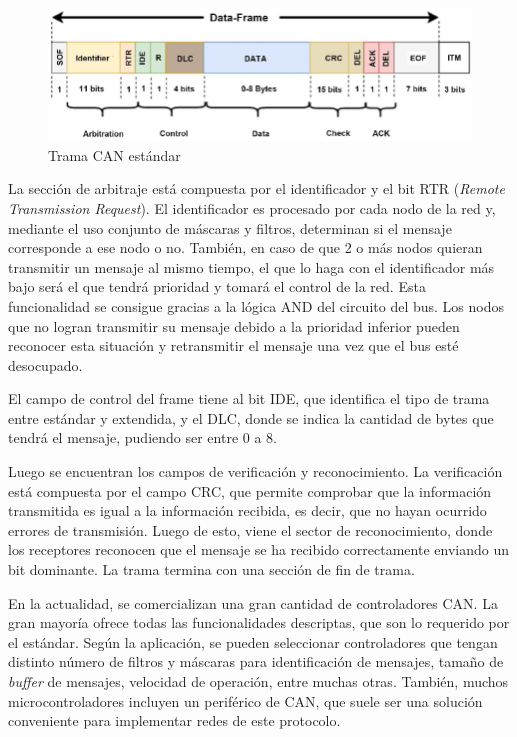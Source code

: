\begin{figure}[htbp]
	\centering
	\includegraphics[scale=.4]{./Figures/CANBUS-frame.png}
	\caption{Trama CAN estándar\protect\footnotemark}
	\label{fig:trama_can}
\end{figure}


La sección de arbitraje está compuesta por el identificador y el bit RTR (\textit{Remote Transmission Request}). El identificador es procesado por cada nodo de la red y, mediante el uso conjunto de máscaras y filtros, determinan si el mensaje corresponde a ese nodo o no. También, en caso de que 2 o más nodos quieran transmitir un mensaje al mismo tiempo, el que lo haga con el identificador más bajo será el que tendrá prioridad y tomará el control de la red. Esta funcionalidad se consigue gracias a la lógica AND del circuito del bus. Los nodos que no logran transmitir su mensaje debido a la prioridad inferior pueden reconocer esta situación y retransmitir el mensaje una vez que el bus esté desocupado.

El campo de control del frame tiene al bit IDE, que identifica el tipo de trama entre estándar y extendida, y el DLC, donde se indica la cantidad de bytes que tendrá el mensaje,  pudiendo ser entre 0 a 8.

Luego se encuentran los campos de verificación y reconocimiento. La verificación está compuesta por el campo CRC, que permite comprobar que la información transmitida es igual a la información recibida, es decir, que no hayan ocurrido errores de transmisión. Luego de esto, viene el sector de reconocimiento, donde los receptores reconocen que el mensaje se ha recibido correctamente enviando un bit dominante. La trama termina con una sección de fin de trama.

En la actualidad, se comercializan una gran cantidad de controladores CAN. La gran mayoría ofrece todas las funcionalidades descriptas, que son lo requerido por el estándar. Según la aplicación, se pueden seleccionar controladores que tengan distinto número de filtros y máscaras para identificación de mensajes, tamaño de \textit{buffer} de mensajes, velocidad de operación, entre muchas otras. También, muchos microcontroladores incluyen un periférico de CAN, que suele ser una solución conveniente para implementar redes de este protocolo.


